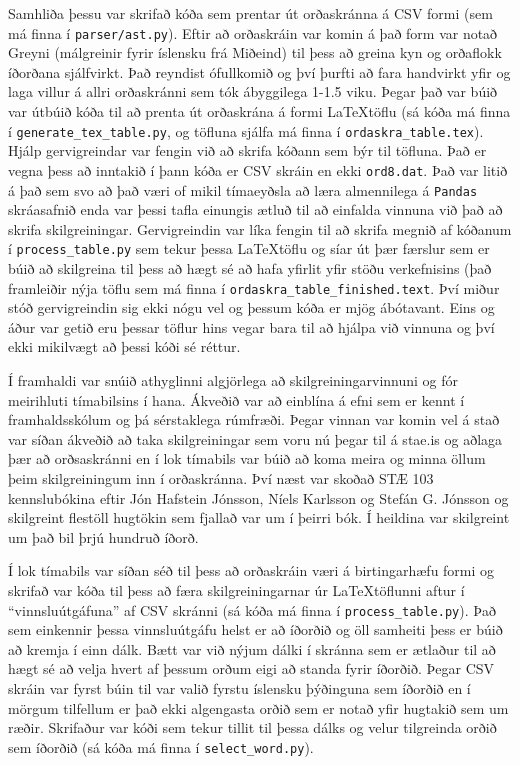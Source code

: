 \documentclass[]{article}
\begin{document}
Samhliða þessu var skrifað kóða sem prentar út orðaskránna á CSV formi (sem má finna í \texttt{parser/ast.py}). Eftir að orðaskráin var komin á það form var notað Greyni (málgreinir fyrir íslensku frá Miðeind) til þess að greina kyn og orðaflokk íðorðana sjálfvirkt. Það reyndist ófullkomið og því þurfti að fara handvirkt yfir og laga villur á allri orðaskránni sem tók ábyggilega 1-1.5 viku. Þegar það var búið var útbúið kóða til að prenta út orðaskrána á formi \LaTeX töflu (sá kóða má finna í \texttt{generate\_tex\_table.py}, og töfluna sjálfa má finna í \texttt{ordaskra\_table.tex}). Hjálp gervigreindar var fengin við að skrifa kóðann sem býr til töfluna. Það er vegna þess að inntakið í þann kóða er CSV skráin en ekki \texttt{ord8.dat}. Það var litið á það sem svo að það væri of mikil tímaeyðsla að læra almennilega á \texttt{Pandas} skráasafnið enda var þessi tafla einungis ætluð til að einfalda vinnuna við það að skrifa skilgreiningar. Gervigreindin var líka fengin til að skrifa megnið af kóðanum í \texttt{process\_table.py} sem tekur þessa \LaTeX töflu og síar út þær færslur sem er búið að skilgreina til þess að hægt sé að hafa yfirlit yfir stöðu verkefnisins (það framleiðir nýja töflu sem má finna í \texttt{ordaskra\_table\_finished.text}. Því miður stóð gervigreindin sig ekki nógu vel og þessum kóða er mjög ábótavant. Eins og áður var getið eru þessar töflur hins vegar bara til að hjálpa við vinnuna og því ekki mikilvægt að þessi kóði sé réttur.

Í framhaldi var snúið athyglinni algjörlega að skilgreiningarvinnuni og fór meirihluti tímabilsins í hana. Ákveðið var að einblína á efni sem er kennt í framhaldsskólum og þá sérstaklega rúmfræði. Þegar vinnan var komin vel á stað var síðan ákveðið að taka skilgreiningar sem voru nú þegar til á stae.is og aðlaga þær að orðsaskránni en í lok tímabils var búið að koma meira og minna öllum þeim skilgreiningum inn í orðaskránna. Því næst var skoðað STÆ 103 kennslubókina eftir Jón Hafstein Jónsson, Níels Karlsson og Stefán G. Jónsson og skilgreint flestöll hugtökin sem fjallað var um í þeirri bók. Í heildina var skilgreint um það bil þrjú hundruð íðorð.

Í lok tímabils var síðan séð til þess að orðaskráin væri á birtingarhæfu formi og skrifað var kóða til þess að færa skilgreiningarnar úr \LaTeX töflunni aftur í ``vinnsluútgáfuna'' af CSV skránni (sá kóða má finna í \texttt{process\_table.py}). Það sem einkennir þessa vinnsluútgáfu helst er að íðorðið og öll samheiti þess er búið að kremja í einn dálk. Bætt var við nýjum dálki í skránna sem er ætlaður til að hægt sé að velja hvert af þessum orðum eigi að standa fyrir íðorðið. Þegar CSV skráin var fyrst búin til var valið fyrstu íslensku þýðinguna sem íðorðið en í mörgum tilfellum er það ekki algengasta orðið sem er notað yfir hugtakið sem um ræðir. Skrifaður var kóði sem tekur tillit til þessa dálks og velur tilgreinda orðið sem íðorðið (sá kóða má finna í \texttt{select\_word.py}).  
\end{document}
